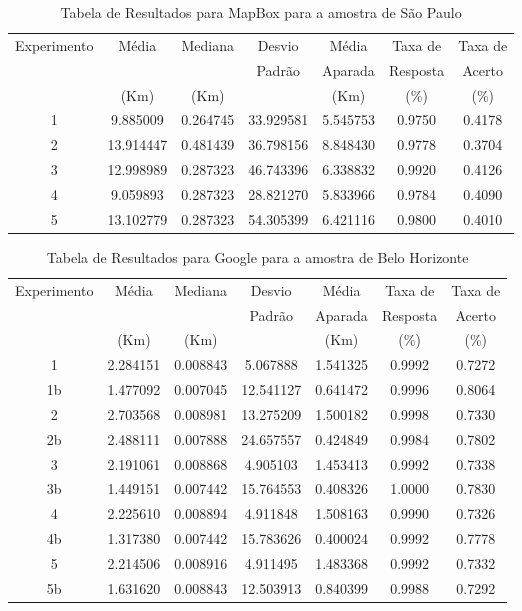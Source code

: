 \begin{anexosenv}
\begin{table}[ht]
\centering
\begin{tabular}{|c|c|c|c|c|c|c|}
\hline
Experimento & Média & Mediana & Desvio & Média & Taxa de & Taxa de \\
 & & & Padrão & Aparada & Resposta & Acerto \\
 & (Km) & (Km) & & (Km) & (\%) & (\%) \\ \hline
1 & 9.885009 & 0.264745 & 33.929581 & 5.545753 & 0.9750 & 0.4178 \\ \hline
2 & 13.914447 & 0.481439 & 36.798156 & 8.848430 & 0.9778 & 0.3704 \\ \hline
3 & 12.998989 & 0.287323 & 46.743396 & 6.338832 & 0.9920 & 0.4126 \\ \hline
4 & 9.059893 & 0.287323 & 28.821270 & 5.833966 & 0.9784 & 0.4090 \\ \hline
5 & 13.102779 & 0.287323 & 54.305399 & 6.421116 & 0.9800 & 0.4010 \\ \hline
\end{tabular}
\caption{Tabela de Resultados para MapBox para a amostra de São Paulo}
\label{tab:mapboxSP}
\end{table}
    
\begin{table}[ht]
\centering
\begin{tabular}{|c|c|c|c|c|c|c|}
\hline
Experimento & Média & Mediana & Desvio & Média & Taxa de & Taxa de \\
 & & & Padrão & Aparada & Resposta & Acerto \\
 & (Km) & (Km) & & (Km) & (\%) & (\%) \\ \hline
1 & 2.284151 & 0.008843 & 5.067888 & 1.541325 & 0.9992 & 0.7272 \\ \hline
1b & 1.477092 & 0.007045 & 12.541127 & 0.641472 & 0.9996 & 0.8064 \\ \hline
2 & 2.703568 & 0.008981 & 13.275209 & 1.500182 & 0.9998 & 0.7330 \\ \hline
2b & 2.488111 & 0.007888 & 24.657557 & 0.424849 & 0.9984 & 0.7802 \\ \hline
3 & 2.191061 & 0.008868 & 4.905103 & 1.453413 & 0.9992 & 0.7338 \\ \hline
3b & 1.449151 & 0.007442 & 15.764553 & 0.408326 & 1.0000 & 0.7830 \\ \hline
4 & 2.225610 & 0.008894 & 4.911848 & 1.508163 & 0.9990 & 0.7326 \\ \hline
4b & 1.317380 & 0.007442 & 15.783626 & 0.400024 & 0.9992 & 0.7778 \\ \hline
5 & 2.214506 & 0.008916 & 4.911495 & 1.483368 & 0.9992 & 0.7332 \\ \hline
5b & 1.631620 & 0.008843 & 12.503913 & 0.840399 & 0.9988 & 0.7292 \\ \hline
\end{tabular}
\caption{Tabela de Resultados para Google para a amostra de Belo Horizonte}
\label{tab:googleBH}
\end{table}


\end{anexosenv}
